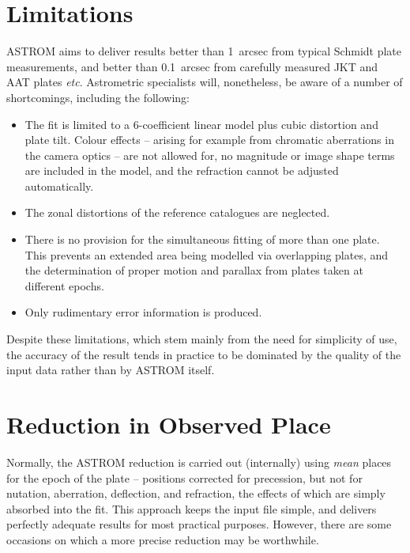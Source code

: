 \documentclass[twoside,11pt]{article}
\newcommand{\xlabel}[1]{}
\renewcommand{\_}{\texttt{\symbol{95}}}
\begin{document}
\section{\xlabel{limitation}Limitations}
\label{limitations}

ASTROM aims to deliver results better than 1~arcsec from typical Schmidt
plate measurements, and better than 0.1~arcsec from carefully measured
JKT and AAT plates \emph{etc}.  Astrometric specialists will, nonetheless,
be aware of a number of shortcomings, including the following:

\begin{itemize}

   \item The fit is limited to a 6-coefficient linear model plus cubic
      distortion and plate tilt.  Colour effects -- arising for example
      from chromatic aberrations in the camera optics -- are not allowed
      for, no magnitude or image shape terms are included in the model,
      and the refraction cannot be adjusted automatically.  

   \item The zonal distortions of the reference catalogues are neglected.

   \item There is no provision for the simultaneous fitting of more
      than one plate.  This prevents an extended area being modelled
      via overlapping plates, and the determination of proper motion
      and parallax from plates taken at different epochs.

   \item Only rudimentary error information is produced.

\end{itemize}

Despite these limitations, which stem mainly from the need for simplicity
of use, the accuracy of the result tends in practice to be dominated by
the quality of the input data rather than by ASTROM itself.

\section{\xlabel{reduction_in_observed_place}Reduction in Observed Place}
\label{reduction_in_observed_place}

Normally, the ASTROM reduction is carried out (internally) using
\textit{mean} places for the epoch of the plate -- positions
corrected for precession, but not for nutation, aberration, deflection,
and refraction, the effects of which are simply absorbed into the fit.
This approach keeps the input file simple, and delivers perfectly adequate
results for most practical purposes.  However, there are some occasions
on which a more precise reduction may be worthwhile.
\end{document}

